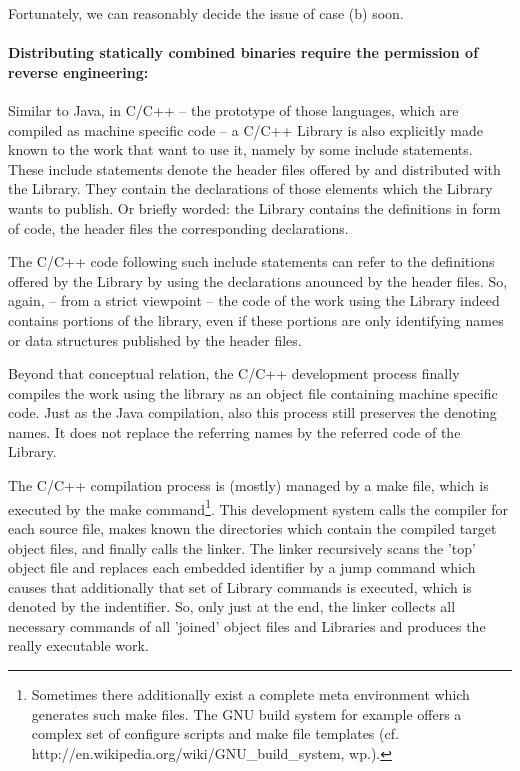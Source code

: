 Fortunately, we can reasonably decide the issue of case (b) soon.

\paragraph{Distributing statically combined binaries require the
permission of reverse engineering:}

Similar to Java, in C/C++ -- the prototype of those languages, which are
compiled as machine specific code -- a C/C++ Library is also explicitly made
known to the work that want to use it, namely by some include statements. These
include statements denote the header files offered by and distributed with the
Library. They contain the declarations of those elements which the Library wants
to publish. Or briefly worded: the Library contains the definitions in form of
code, the header files the corresponding declarations.

The C/C++ code following such include statements can refer to the definitions
offered by the Library by using the declarations anounced by the header files.
So, again, -- from a strict viewpoint -- the code of the work using the Library
indeed contains portions of the library, even if these portions are only
identifying names or data structures published by the header files.

Beyond that conceptual relation, the C/C++ development process finally compiles
the work using the library as an object file containing machine specific code.
Just as the Java compilation, also this process still preserves the denoting
names. It does not replace the referring names by the referred code of the
Library. 

The C/C++ compilation process is (mostly) managed by a make file, which is
executed by the make command\footnote{Sometimes there additionally exist a
complete meta environment which generates such make files. The GNU build system
for example offers a complex set of configure scripts and make file templates
(cf. http://en.wikipedia.org/wiki/GNU\_build\_system, wp.).}. This development
system calls the compiler for each source file, makes known the directories
which contain the compiled target object files, and finally calls the linker.
The linker recursively scans the 'top' object file and replaces each embedded
identifier by a jump command which causes that additionally that set of Library
commands is executed, which is denoted by the indentifier. So, only just at the
end, the linker collects all necessary commands of all 'joined' object files and
Libraries and produces the really executable work.

